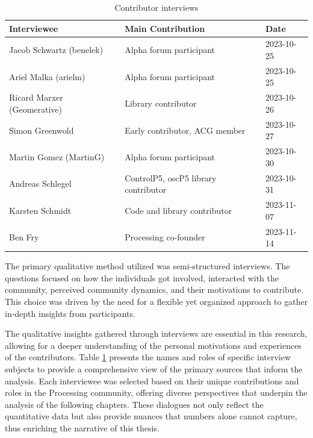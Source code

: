   \begin{table}[ht]
    \begin{adjustbox}{center}
    \begin{tabular}{lll}
    \hline
    Interviewee & Main Contribution & Date \\ \hline
    Jacob Schwartz (benelek) & Alpha forum participant & 2023-10-25 \\
    Ariel Malka (arielm) & Alpha forum participant & 2023-10-25 \\
    Ricard Marxer (Geomerative) & Library contributor & 2023-10-26 \\
    Simon Greenwold & Early contributor, ACG member & 2023-10-27 \\
    Martin Gomez (MartinG) & Alpha forum participant & 2023-10-30 \\
    Andreas Schlegel & ControlP5, oscP5 library contributor & 2023-10-31 \\
    Karsten Schmidt & Code and library contributor & 2023-11-07 \\
    Ben Fry & Processing co-founder & 2023-11-14 \\
    \hline
    \end{tabular}
    \label{tab:interviews}
\end{adjustbox}

    \caption[Contributor interviews]{Contributor interviews}
    \label{tab:interviews}

\end{table}
    
The primary qualitative method utilized was semi-structured interviews. The questions focused on how the individuals got involved, interacted with the community, perceived community dynamics, and their motivations to contribute. This choice was driven by the need for a flexible yet organized approach to gather in-depth insights from participants.

The qualitative insights gathered through interviews are essential in this research, allowing for a deeper understanding of the personal motivations and experiences of the contributors. Table \ref{tab:interviews} presents the names and roles of specific interview subjects to provide a comprehensive view of the primary sources that inform the analysis. Each interviewee was selected based on their unique contributions and roles in the Processing community, offering diverse perspectives that underpin the analysis of the following chapters. These dialogues not only reflect the quantitative data but also provide nuances that numbers alone cannot capture, thus enriching the narrative of this thesis.


